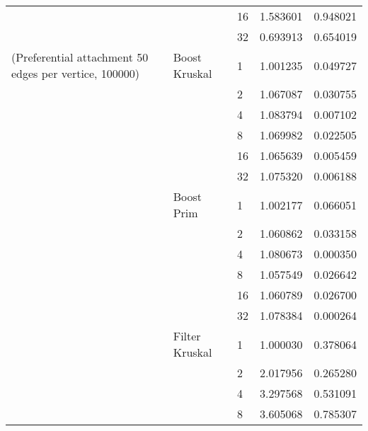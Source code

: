\begin{tabular}{lllrr}
                                                       &                     & 16 &  1.583601 &  0.948021 \\
                                                       &                     & 32 &  0.693913 &  0.654019 \\
(Preferential attachment 50 edges per vertice, 100000) & Boost Kruskal & 1  &  1.001235 &  0.049727 \\
                                                       &                     & 2  &  1.067087 &  0.030755 \\
                                                       &                     & 4  &  1.083794 &  0.007102 \\
                                                       &                     & 8  &  1.069982 &  0.022505 \\
                                                       &                     & 16 &  1.065639 &  0.005459 \\
                                                       &                     & 32 &  1.075320 &  0.006188 \\
                                                       & Boost Prim & 1  &  1.002177 &  0.066051 \\
                                                       &                     & 2  &  1.060862 &  0.033158 \\
                                                       &                     & 4  &  1.080673 &  0.000350 \\
                                                       &                     & 8  &  1.057549 &  0.026642 \\
                                                       &                     & 16 &  1.060789 &  0.026700 \\
                                                       &                     & 32 &  1.078384 &  0.000264 \\
                                                       & Filter Kruskal & 1  &  1.000030 &  0.378064 \\
                                                       &                     & 2  &  2.017956 &  0.265280 \\
                                                       &                     & 4  &  3.297568 &  0.531091 \\
                                                       &                     & 8  &  3.605068 &  0.785307 \\

\end{tabular}
